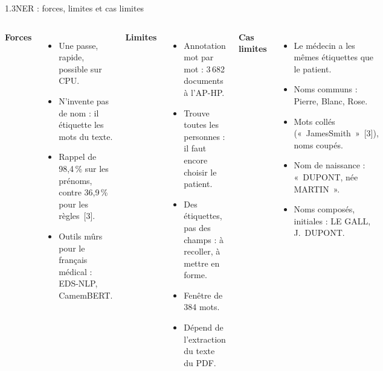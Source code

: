 \documentclass[11pt,aspectratio=169]{beamer}
\newcommand{\refs}[1]{{\color{mlblue}[#1]}}
\newcommand{\pct}[1]{#1\,\%}
\begin{document}
\begin{frame}{1.3\quad NER : forces, limites et cas limites}
  \begin{columns}[T]
    \textbf{Forces}
    {\small
    \begin{itemize}\setlength{\itemsep}{2pt}
      \item Une passe, rapide, possible sur CPU.
      \item N'invente pas de nom : il étiquette les mots du texte.
      \item Rappel de \pct{98,4} sur les prénoms, contre \pct{36,9} pour les
        règles~\refs{3}.
      \item Outils mûrs pour le français médical : EDS-NLP, CamemBERT.
    \end{itemize}}
    \textbf{Limites}
    {\small
    \begin{itemize}\setlength{\itemsep}{2pt}
      \item Annotation mot par mot : 3\,682 documents à l'AP-HP.
      \item Trouve toutes les personnes : il faut encore choisir le patient.
      \item Des étiquettes, pas des champs : à recoller, à mettre en forme.
      \item Fenêtre de 384 mots.
      \item Dépend de l'extraction du texte du PDF.
    \end{itemize}}
    \textbf{Cas limites}
    {\small
    \begin{itemize}\setlength{\itemsep}{2pt}
      \item Le médecin a les mêmes étiquettes que le patient.
      \item Noms communs : Pierre, Blanc, Rose.
      \item Mots collés («~JamesSmith~»~\refs{3}), noms coupés.
      \item Nom de naissance : «~DUPONT, née MARTIN~».
      \item Noms composés, initiales : LE GALL, J.~DUPONT.
    \end{itemize}}
  \end{columns}
\end{frame}
\end{document}
